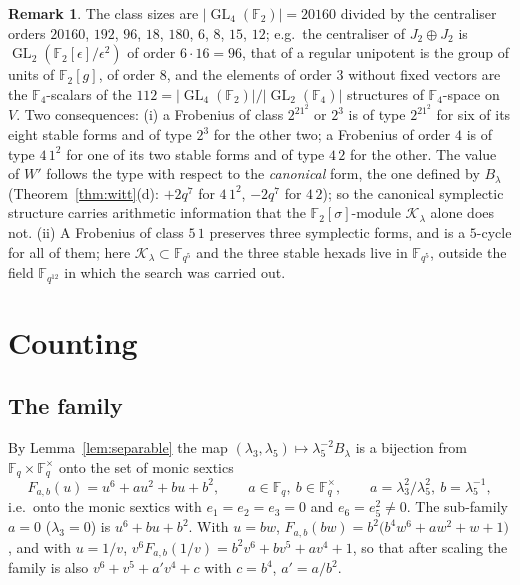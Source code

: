 ﻿\documentclass[12pt,a4paper]{amsart}
\theoremstyle{definition}
\newtheorem{remark}[theorem]{Remark}
\newcommand{\F}{\mathbb{F}}
\newcommand{\GL}{\operatorname{GL}}
\newcommand{\Kk}{\mathcal{K}}
\begin{document}
\begin{remark}
The class sizes are $|\GL_4(\F_2)|=20160$ divided by the centraliser orders $20160$, $192$, $96$, $18$, $180$, $6$, $8$, $15$, $12$; e.g.\ the centraliser of $J_2\oplus J_2$ is $\GL_2(\F_2[\epsilon]/\epsilon^2)$ of order $6\cdot16=96$, that of a regular unipotent is the group of units of $\F_2[g]$, of order $8$, and the elements of order $3$ without fixed vectors are the $\F_4$-scalars of the $112=|\GL_4(\F_2)|/|\GL_2(\F_4)|$ structures of $\F_4$-space on $V$. Two consequences: (i) a Frobenius of class $2^21^2$ or $2^3$ is of type $2^21^2$ for six of its eight stable forms and of type $2^3$ for the other two; a Frobenius of order $4$ is of type $4\,1^2$ for one of its two stable forms and of type $4\,2$ for the other. The value of $W'$ follows the type with respect to the \emph{canonical} form, the one defined by $B_\lambda$ (Theorem~\ref{thm:witt}(d): $+2q^7$ for $4\,1^2$, $-2q^7$ for $4\,2$); so the canonical symplectic structure carries arithmetic information that the $\F_2[\sigma]$-module $\Kk_\lambda$ alone does not. (ii) A Frobenius of class $5\,1$ preserves three symplectic forms, and is a $5$-cycle for all of them; here $\Kk_\lambda\subset\F_{q^5}$ and the three stable hexads live in $\F_{q^5}$, outside the field $\F_{q^{12}}$ in which the search was carried out.
\end{remark}

\section{Counting}\label{sec:counting}

\subsection{The family}
By Lemma~\ref{lem:separable} the map $(\lambda_3,\lambda_5)\mapsto\lambda_5^{-2}B_\lambda$ is a bijection from $\F_q\times\F_q^\times$ onto the set of monic sextics
\begin{equation}\label{eq:family}
F_{a,b}(u)=u^6+au^2+bu+b^2,\qquad a\in\F_q,\ b\in\F_q^\times,\qquad a=\lambda_3^2/\lambda_5^2,\ b=\lambda_5^{-1},
\end{equation}
i.e.\ onto the monic sextics with $e_1=e_2=e_3=0$ and $e_6=e_5^2\ne0$. The sub-family $a=0$ ($\lambda_3=0$) is $u^6+bu+b^2$. With $u=bw$, $F_{a,b}(bw)=b^2\bigl(b^4w^6+aw^2+w+1\bigr)$, and with $u=1/v$, $v^6F_{a,b}(1/v)=b^2v^6+bv^5+av^4+1$, so that after scaling the family is also $v^6+v^5+a'v^4+c$ with $c=b^4$, $a'=a/b^2$.
\end{document}
